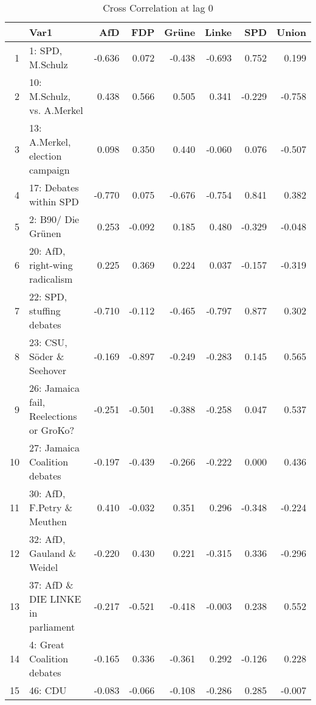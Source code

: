\begin{table}[ht]
\centering
\begin{tabular}{rlrrrrrr}
  \hline
 & Var1 & AfD & FDP & Grüne & Linke & SPD & Union \\ 
  \hline
1 & 1: SPD, M.Schulz & -0.636 & 0.072 & -0.438 & -0.693 & 0.752 & 0.199 \\ 
  2 & 10: M.Schulz, vs. A.Merkel & 0.438 & 0.566 & 0.505 & 0.341 & -0.229 & -0.758 \\ 
  3 & 13: A.Merkel, election campaign & 0.098 & 0.350 & 0.440 & -0.060 & 0.076 & -0.507 \\ 
  4 & 17: Debates within SPD & -0.770 & 0.075 & -0.676 & -0.754 & 0.841 & 0.382 \\ 
  5 & 2: B90/ Die Grünen & 0.253 & -0.092 & 0.185 & 0.480 & -0.329 & -0.048 \\ 
  6 & 20: AfD, right-wing radicalism & 0.225 & 0.369 & 0.224 & 0.037 & -0.157 & -0.319 \\ 
  7 & 22: SPD, stuffing debates & -0.710 & -0.112 & -0.465 & -0.797 & 0.877 & 0.302 \\ 
  8 & 23: CSU, Söder \& Seehover & -0.169 & -0.897 & -0.249 & -0.283 & 0.145 & 0.565 \\ 
  9 & 26: Jamaica fail, Reelections or GroKo? & -0.251 & -0.501 & -0.388 & -0.258 & 0.047 & 0.537 \\ 
  10 & 27: Jamaica Coalition debates & -0.197 & -0.439 & -0.266 & -0.222 & 0.000 & 0.436 \\ 
  11 & 30: AfD, F.Petry \& Meuthen & 0.410 & -0.032 & 0.351 & 0.296 & -0.348 & -0.224 \\ 
  12 & 32: AfD, Gauland \& Weidel & -0.220 & 0.430 & 0.221 & -0.315 & 0.336 & -0.296 \\ 
  13 & 37: AfD \& DIE LINKE in parliament & -0.217 & -0.521 & -0.418 & -0.003 & 0.238 & 0.552 \\ 
  14 & 4: Great Coalition debates & -0.165 & 0.336 & -0.361 & 0.292 & -0.126 & 0.228 \\ 
  15 & 46: CDU & -0.083 & -0.066 & -0.108 & -0.286 & 0.285 & -0.007 \\ 
   \hline
\end{tabular}
\caption{Cross Correlation at lag 0} 
\end{table}
